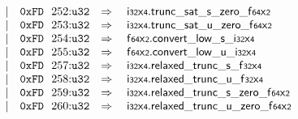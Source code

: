 $$\begin{array}[t]{@{}lrrl@{}l@{}l@{}l@{}}
& & | & \mathtt{0xFD}~~252{:}{\mathtt{u32}} & \quad\Rightarrow\quad{} & {\mathsf{i{\scriptstyle 32}}}{\mathsf{x}}{\mathsf{{\scriptstyle 4}}} {.} {{\mathsf{trunc\_sat}}{\mathsf{\_}}{\mathsf{s}}{\mathsf{\_}}{\mathsf{zero}}}{\mathsf{\_}}{{\mathsf{f{\scriptstyle 64}}}{\mathsf{x}}{\mathsf{{\scriptstyle 2}}}} \\
& & | & \mathtt{0xFD}~~253{:}{\mathtt{u32}} & \quad\Rightarrow\quad{} & {\mathsf{i{\scriptstyle 32}}}{\mathsf{x}}{\mathsf{{\scriptstyle 4}}} {.} {{\mathsf{trunc\_sat}}{\mathsf{\_}}{\mathsf{u}}{\mathsf{\_}}{\mathsf{zero}}}{\mathsf{\_}}{{\mathsf{f{\scriptstyle 64}}}{\mathsf{x}}{\mathsf{{\scriptstyle 2}}}} \\
& & | & \mathtt{0xFD}~~254{:}{\mathtt{u32}} & \quad\Rightarrow\quad{} & {\mathsf{f{\scriptstyle 64}}}{\mathsf{x}}{\mathsf{{\scriptstyle 2}}} {.} {{\mathsf{convert}}{\mathsf{\_}}{\mathsf{low}}{\mathsf{\_}}{\mathsf{s}}}{\mathsf{\_}}{{\mathsf{i{\scriptstyle 32}}}{\mathsf{x}}{\mathsf{{\scriptstyle 4}}}} \\
& & | & \mathtt{0xFD}~~255{:}{\mathtt{u32}} & \quad\Rightarrow\quad{} & {\mathsf{f{\scriptstyle 64}}}{\mathsf{x}}{\mathsf{{\scriptstyle 2}}} {.} {{\mathsf{convert}}{\mathsf{\_}}{\mathsf{low}}{\mathsf{\_}}{\mathsf{u}}}{\mathsf{\_}}{{\mathsf{i{\scriptstyle 32}}}{\mathsf{x}}{\mathsf{{\scriptstyle 4}}}} \\
& & | & \mathtt{0xFD}~~257{:}{\mathtt{u32}} & \quad\Rightarrow\quad{} & {\mathsf{i{\scriptstyle 32}}}{\mathsf{x}}{\mathsf{{\scriptstyle 4}}} {.} {{\mathsf{relaxed\_trunc}}{\mathsf{\_}}{\mathsf{s}}}{\mathsf{\_}}{{\mathsf{f{\scriptstyle 32}}}{\mathsf{x}}{\mathsf{{\scriptstyle 4}}}} \\
& & | & \mathtt{0xFD}~~258{:}{\mathtt{u32}} & \quad\Rightarrow\quad{} & {\mathsf{i{\scriptstyle 32}}}{\mathsf{x}}{\mathsf{{\scriptstyle 4}}} {.} {{\mathsf{relaxed\_trunc}}{\mathsf{\_}}{\mathsf{u}}}{\mathsf{\_}}{{\mathsf{f{\scriptstyle 32}}}{\mathsf{x}}{\mathsf{{\scriptstyle 4}}}} \\
& & | & \mathtt{0xFD}~~259{:}{\mathtt{u32}} & \quad\Rightarrow\quad{} & {\mathsf{i{\scriptstyle 32}}}{\mathsf{x}}{\mathsf{{\scriptstyle 4}}} {.} {{\mathsf{relaxed\_trunc}}{\mathsf{\_}}{\mathsf{s}}{\mathsf{\_}}{\mathsf{zero}}}{\mathsf{\_}}{{\mathsf{f{\scriptstyle 64}}}{\mathsf{x}}{\mathsf{{\scriptstyle 2}}}} \\
& & | & \mathtt{0xFD}~~260{:}{\mathtt{u32}} & \quad\Rightarrow\quad{} & {\mathsf{i{\scriptstyle 32}}}{\mathsf{x}}{\mathsf{{\scriptstyle 4}}} {.} {{\mathsf{relaxed\_trunc}}{\mathsf{\_}}{\mathsf{u}}{\mathsf{\_}}{\mathsf{zero}}}{\mathsf{\_}}{{\mathsf{f{\scriptstyle 64}}}{\mathsf{x}}{\mathsf{{\scriptstyle 2}}}} \\
\end{array}
$$

